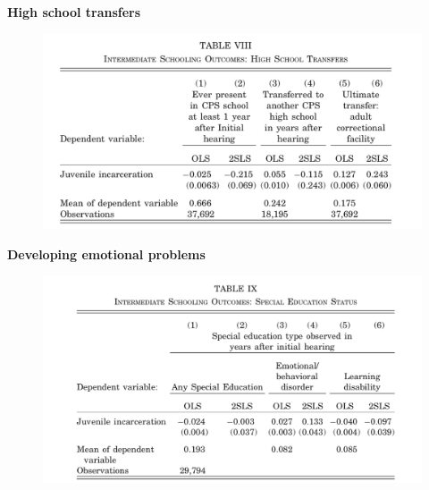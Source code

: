 \documentclass[notes=show]{beamer}
\begin{document}
\begin{frame}[plain]

	\begin{center}
	\textbf{High school transfers}
	\end{center}
	
	\begin{figure}
	\includegraphics[scale=0.2]{./lecture_includes/transfers.png}
	\end{figure}
\end{frame}


\begin{frame}[plain]

	\begin{center}
	\textbf{Developing emotional problems}
	\end{center}
	
	\begin{figure}
	\includegraphics[scale=0.2]{./lecture_includes/disorder.png}
	\end{figure}
\end{frame}
\end{document}
